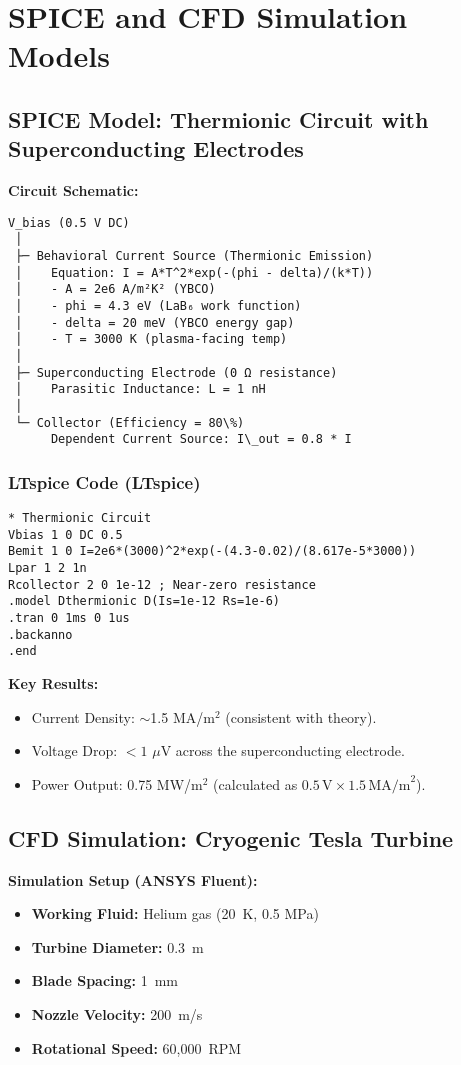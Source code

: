 \documentclass[12pt]{article}
\begin{document}
\section{SPICE and CFD Simulation Models}
\subsection{SPICE Model: Thermionic Circuit with Superconducting Electrodes}
\textbf{Circuit Schematic:}
\begin{verbatim}
V_bias (0.5 V DC)
 │
 ├─ Behavioral Current Source (Thermionic Emission)
 │    Equation: I = A*T^2*exp(-(phi - delta)/(k*T))
 │    - A = 2e6 A/m²K² (YBCO)
 │    - phi = 4.3 eV (LaB₆ work function)
 │    - delta = 20 meV (YBCO energy gap)
 │    - T = 3000 K (plasma-facing temp)
 │
 ├─ Superconducting Electrode (0 Ω resistance)
 │    Parasitic Inductance: L = 1 nH
 │
 └─ Collector (Efficiency = 80\%)
      Dependent Current Source: I\_out = 0.8 * I
\end{verbatim}

\subsubsection*{LTspice Code (LTspice)}
\begin{lstlisting}[language=spice,caption=LTspice Thermionic Circuit]
* Thermionic Circuit
Vbias 1 0 DC 0.5
Bemit 1 0 I=2e6*(3000)^2*exp(-(4.3-0.02)/(8.617e-5*3000))
Lpar 1 2 1n
Rcollector 2 0 1e-12 ; Near-zero resistance
.model Dthermionic D(Is=1e-12 Rs=1e-6)
.tran 0 1ms 0 1us
.backanno
.end
\end{lstlisting}

\textbf{Key Results:}
\begin{itemize}
    \item Current Density: $\sim$1.5 MA/m$^2$ (consistent with theory).
    \item Voltage Drop: $<1$ $\mu$V across the superconducting electrode.
    \item Power Output: 0.75 MW/m$^2$ (calculated as $0.5\,\text{V} \times 1.5\,\text{MA/m}^2$).
\end{itemize}

\subsection{CFD Simulation: Cryogenic Tesla Turbine}
\textbf{Simulation Setup (ANSYS Fluent):}
\begin{itemize}
    \item \textbf{Working Fluid:} Helium gas (20~K, 0.5 MPa)
    \item \textbf{Turbine Diameter:} 0.3~m
    \item \textbf{Blade Spacing:} 1~mm
    \item \textbf{Nozzle Velocity:} 200~m/s
    \item \textbf{Rotational Speed:} 60,000~RPM
\end{itemize}
\end{document}
